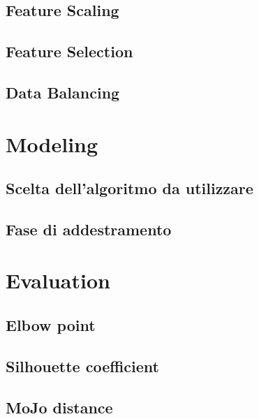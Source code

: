 \documentclass[a4paper, 12pt]{report}
\begin{document}
        \section{Feature Scaling}\label{sec:feature-scaling}


        \section{Feature Selection}\label{sec:feature-selection}


        \section{Data Balancing}\label{sec:data-balancing}


    \chapter{Modeling}\label{ch:modeling}


        \section{Scelta dell'algoritmo da utilizzare}\label{sec:scelta-dell'algoritmo-da-utilizzare}


        \section{Fase di addestramento}\label{sec:fase-di-addestramento}


    \chapter{Evaluation}\label{ch:evaluation}


        \section{Elbow point}\label{sec:elbow-point}


        \section{Silhouette coefficient}\label{sec:silhouette-coefficient}


        \section{MoJo distance}\label{sec:mojo-distance}
\end{document}
